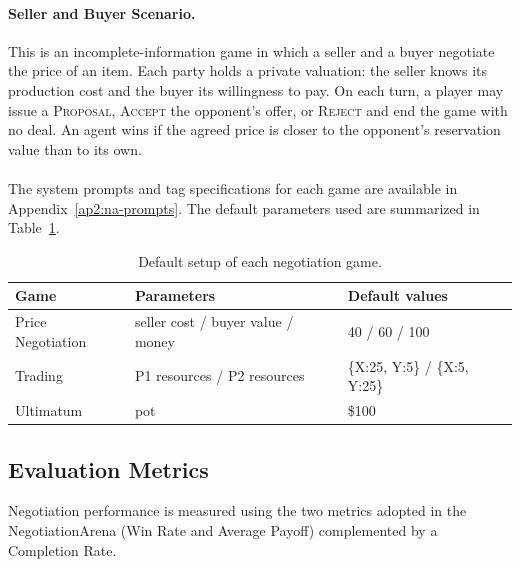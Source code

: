\paragraph{Seller and Buyer Scenario.}
This is an incomplete-information game in which a seller and a buyer negotiate the price of an item. Each party holds a private valuation: the seller knows its production cost and the buyer its willingness to pay. On each turn, a player may issue a \textsc{Proposal}, \textsc{Accept} the opponent's offer, or \textsc{Reject} and end the game with no deal. An agent wins if the agreed price is closer to the opponent's reservation value than to its own.

\paragraph{}

 The system prompts and tag specifications for each game are available in Appendix~\ref{ap2:na-prompts}. The default parameters used are summarized in Table~\ref{tab:game-setup}.

\begin{table}
    \centering
    \caption{Default setup of each negotiation game.}
    \label{tab:game-setup}
    \begin{tabular}{lll}
        \toprule
        \textbf{Game} & \textbf{Parameters} & \textbf{Default values} \\
        \midrule
        Price Negotiation & seller cost / buyer value / money & 40 / 60 / 100 \\
        Trading           & P1 resources / P2 resources       & \{X:25, Y:5\} / \{X:5, Y:25\} \\
        Ultimatum         & pot                               & \$100 \\
        \bottomrule
    \end{tabular}
\end{table}

\subsection{Evaluation Metrics}

Negotiation performance is measured using the two metrics adopted in the NegotiationArena (Win Rate and Average Payoff) complemented by a Completion Rate.

